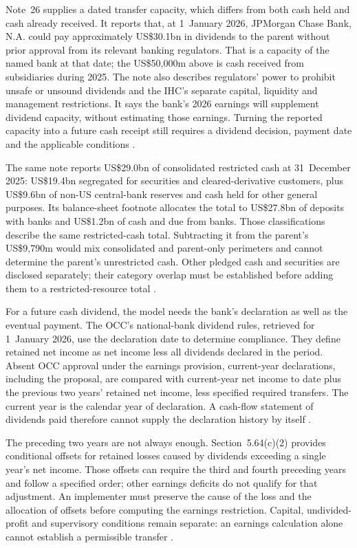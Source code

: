Note~26 supplies a dated transfer capacity, which differs from both cash held
and cash already received. It reports that, at 1~January 2026, JPMorgan Chase
Bank, N.A. could pay approximately US\$30.1bn in dividends to the parent
without prior approval from its relevant banking regulators. That is a
capacity of the named bank at that date; the US\$50{,}000m above is cash
received from subsidiaries during 2025. The note also describes regulators'
power to prohibit unsafe or unsound dividends and the IHC's separate capital,
liquidity and management restrictions. It says the bank's 2026 earnings will
supplement dividend capacity, without estimating those earnings. Turning the
reported capacity into a future cash receipt still requires a dividend decision,
payment date and the applicable conditions \citep[pp.~4, 292]{jpmorgan2025tenk}.

The same note reports US\$29.0bn of consolidated restricted cash at
31~December 2025: US\$19.4bn segregated for securities and cleared-derivative
customers, plus US\$9.6bn of non-US central-bank reserves and cash held for
other general purposes. Its balance-sheet footnote allocates the total to
US\$27.8bn of deposits with banks and US\$1.2bn of cash and due from banks.
Those classifications describe the same restricted-cash total. Subtracting it
from the parent's US\$9{,}790m would mix consolidated and parent-only
perimeters and cannot determine the parent's unrestricted cash. Other pledged
cash and securities are disclosed separately; their category overlap must be
established before adding them to a restricted-resource total
\citep[p.~292]{jpmorgan2025tenk}.


For a future cash dividend, the model needs the bank's declaration as well as
the eventual payment. The OCC's national-bank dividend rules, retrieved for
1~January 2026, use the declaration date to determine compliance. They define
retained net income as net income less all dividends declared in the period.
Absent OCC approval under the earnings provision, current-year declarations, including
the proposal, are compared with current-year net income to date plus the
previous two years' retained net income, less specified required transfers.
The current year is the calendar year of declaration. A cash-flow statement
of dividends paid therefore cannot supply the declaration history by itself
\citep[12~CFR~5.61--5.64]{occnationaldividends2026}.

The preceding two years are not always enough. Section~5.64(c)(2) provides
conditional offsets for retained losses caused by dividends exceeding a
single year's net income. Those offsets can require the third and fourth
preceding years and follow a specified order; other earnings deficits do not
qualify for that adjustment. An implementer must preserve the cause of the
loss and the allocation of offsets before computing the earnings restriction.
Capital, undivided-profit and supervisory conditions remain separate: an
earnings calculation alone cannot establish a permissible transfer
\citep[12~CFR~5.63--5.65]{occnationaldividends2026}.

